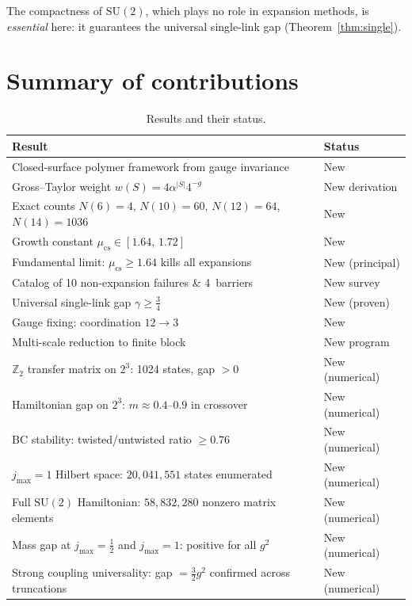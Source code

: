 \documentclass[12pt,a4paper]{article}
\newcommand{\Z}{\mathbb{Z}}
\newcommand{\half}{\tfrac{1}{2}}
\begin{document}
The compactness of $\mathrm{SU}(2)$, which plays no role in expansion methods, is \emph{essential} here: it guarantees the universal single-link gap (Theorem~\ref{thm:single}).

\section{Summary of contributions}\label{sec:contributions}

\begin{table}[h]
\centering
\caption{Results and their status.}
\label{tab:summary}
\begin{tabular}{@{}ll@{}}
\toprule
\textbf{Result} & \textbf{Status} \\
\midrule
Closed-surface polymer framework from gauge invariance & New \\
Gross--Taylor weight $w(S)=4\alpha^{|S|}4^{-g}$ & New derivation \\
Exact counts $N(6){=}4$, $N(10){=}60$, $N(12){=}64$, $N(14){=}1036$ & New \\
Growth constant $\mu_{\mathrm{cs}}\in[1.64,\,1.72]$ & New \\
Fundamental limit: $\mu_{\mathrm{cs}}\ge 1.64$ kills all expansions & New (principal) \\
Catalog of 10 non-expansion failures \& 4~barriers & New survey \\
Universal single-link gap $\gamma\ge\frac{3}{4}$ & New (proven) \\
Gauge fixing: coordination $12\to 3$ & New \\
Multi-scale reduction to finite block & New program \\
$\Z_2$ transfer matrix on $2^3$: 1024 states, gap ${>}0$ & New (numerical) \\
Hamiltonian gap on $2^3$: $m\approx 0.4$--$0.9$ in crossover & New (numerical) \\
BC stability: twisted/untwisted ratio $\ge 0.76$ & New (numerical) \\
$j_{\max}{=}1$ Hilbert space: $20{,}041{,}551$ states enumerated & New (numerical) \\
Full $\mathrm{SU}(2)$ Hamiltonian: $58{,}832{,}280$ nonzero matrix elements & New (numerical) \\
Mass gap at $j_{\max}{=}\half$ and $j_{\max}{=}1$: positive for all $g^2$ & New (numerical) \\
Strong coupling universality: gap $=\frac{3}{2}g^2$ confirmed across truncations & New (numerical) \\

\end{tabular}
\end{table}
\end{document}
